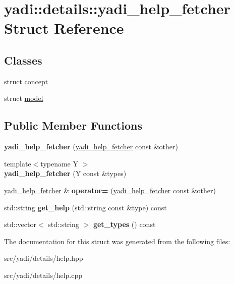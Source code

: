\hypertarget{structyadi_1_1details_1_1yadi__help__fetcher}{}\section{yadi\+:\+:details\+:\+:yadi\+\_\+help\+\_\+fetcher Struct Reference}
\label{structyadi_1_1details_1_1yadi__help__fetcher}
\subsection*{Classes}
\begin{DoxyCompactItemize}
\item 
struct \hyperlink{structyadi_1_1details_1_1yadi__help__fetcher_1_1concept}{concept}
\item 
struct \hyperlink{structyadi_1_1details_1_1yadi__help__fetcher_1_1model}{model}
\end{DoxyCompactItemize}
\subsection*{Public Member Functions}
\begin{DoxyCompactItemize}
\item 
\mbox{\label{structyadi_1_1details_1_1yadi__help__fetcher_a5f8b1e45b37c8aa71ddfefeeaf8d05bf}} 
{\bfseries yadi\+\_\+help\+\_\+fetcher} (\hyperlink{structyadi_1_1details_1_1yadi__help__fetcher}{yadi\+\_\+help\+\_\+fetcher} const \&other)
\item 
\mbox{\label{structyadi_1_1details_1_1yadi__help__fetcher_a0d919e20c92d45110827975ae7127f5f}} 
{\footnotesize template$<$typename Y $>$ }\\{\bfseries yadi\+\_\+help\+\_\+fetcher} (Y const \&types)
\item 
\mbox{\label{structyadi_1_1details_1_1yadi__help__fetcher_a74c236f0e49bd623a75b49ca3dbd201a}} 
\hyperlink{structyadi_1_1details_1_1yadi__help__fetcher}{yadi\+\_\+help\+\_\+fetcher} \& {\bfseries operator=} (\hyperlink{structyadi_1_1details_1_1yadi__help__fetcher}{yadi\+\_\+help\+\_\+fetcher} const \&other)
\item 
\mbox{\label{structyadi_1_1details_1_1yadi__help__fetcher_a16119e731cb7fcb5775ed36a570fefa5}} 
std\+::string {\bfseries get\+\_\+help} (std\+::string const \&type) const
\item 
\mbox{\label{structyadi_1_1details_1_1yadi__help__fetcher_a5170a74f42bd371aa9eb40871d793478}} 
std\+::vector$<$ std\+::string $>$ {\bfseries get\+\_\+types} () const
\end{DoxyCompactItemize}


The documentation for this struct was generated from the following files\+:\begin{DoxyCompactItemize}
\item 
src/yadi/details/help.\+hpp\item 
src/yadi/details/help.\+cpp\end{DoxyCompactItemize}
